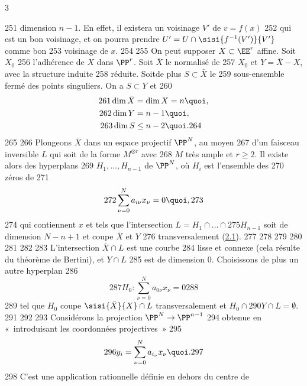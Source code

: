 3	\documentclass[10pt]{../fichiers-configuration-latex/smfart}
\begin{document}
   251	dimension $n-1$. En effet, il existera un voisinage $V'$ de $v=f(x)$
   252	qui est un bon voisinage, et on pourra prendre $U'=U\cap \sisi{f^{-1}(V')}{V'}$ comme bon
   253	voisinage de $x$.
   254	
   255	On peut supposer $X\subset \EE^r$ affine. Soit $X_0$
   256	l'adhérence de $X$ dans $\PP^r$. Soit $\bar{X}$ le normalisé de
   257	$X_0$ et $Y=\bar{X}-X$, avec la structure induite
   258	réduite. Soit\pageoriginale de plus $S\subset \bar{X}$ le
   259	sous-ensemble fermé des points singuliers. On a $S\subset Y$ et
   260	\begin{align*}
   261	\dim \bar{X} &= \dim X=n{\quoi},\\
   262	\dim Y &= n-1{\quoi},\\
   263	\dim S &\leq n-2{\quoi}.
   264	\end{align*}
   265	
   266	Plongeons $\bar{X}$ dans un espace projectif $\PP^N$, au moyen
   267	d'un faisceau inversible $L$ qui soit de la forme $M^{\otimes r}$ avec
   268	$M$ très ample et $r\geq 2$. Il existe alors des hyperplans %
   269	$H_1,\ldots, H_{n-1}$ de $\PP^N$, où $H_i$ est l'ensemble des
   270	zéros de
   271	$$
   272	\sum^N_{\nu =0}a_{i\nu} x_{\nu} =0{\quoi},
   273	$$
   274	qui contiennent $x$ et tels que l'intersection $L=H_1\cap\ldots \cap
   275	H_{n-1}$ soit de dimension $N-n+1$ et coupe $\bar{X}$ et $Y$
   276	transversalement (\hyperref[XI.thm2.1]{2.1}). %
   277	 %
   278	 %
   279	 %
   280	 %
   281	 %
   282	 %
   283	L'intersection $\bar{X}\cap L$ est une courbe
   284	lisse et connexe (cela résulte du théorème de Bertini), et $Y\cap L$
   285	est de dimension $0$. Choisissons de plus un autre hyperplan
   286	$$
   287	H_0:\sum^N_{\nu=0}a_{0 \nu}x_{\nu}=0
   288	$$
   289	tel que $H_0$ coupe $\sisi{\bar{X}}{X}\cap L$ transversalement et $H_0\cap
   290	Y\cap L=∅$. %
   291	                    %
   292	
   293	Considérons la projection $\PP^N\rightarrow \PP^{n-1}$
   294	obtenue en « introduisant les coordonnées projectives »
   295	$$
   296	y_i=\sum^N_{\nu =0}a_{i_{\nu}}x_{\nu}{\quoi}.
   297	$$
   298	C'est une application rationnelle définie en dehors du centre de
\end{document}
